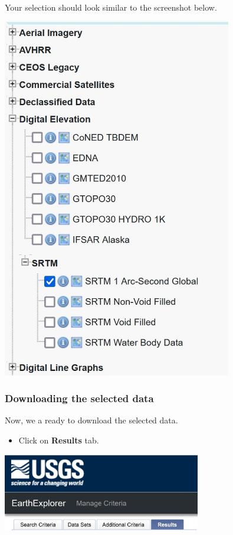 \documentclass[
  letterpaper,
  DIV=11,
  numbers=noendperiod]{scrreprt}
\providecommand{\tightlist}{%
  \setlength{\itemsep}{0pt}\setlength{\parskip}{0pt}}\usepackage{longtable,booktabs,array}
\begin{document}
Your selection should look similar to the screenshot below.

\includegraphics[width=3.94792in,height=\textheight]{./img06/image28.jpg}

\hypertarget{downloading-the-selected-data}{%
\subsubsection{Downloading the selected
data}\label{downloading-the-selected-data}}

Now, we a ready to download the selected data.

\begin{itemize}
\tightlist
\item
  Click on \textbf{Results} tab.
\end{itemize}

\includegraphics[width=3.40625in,height=\textheight]{./img06/image29.jpg}
\end{document}

